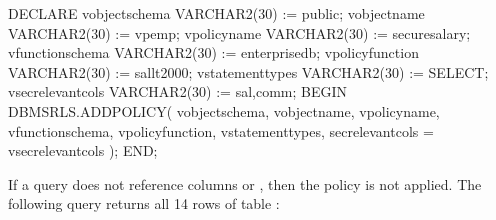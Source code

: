 \documentclass[letterpaper,10pt,english,openany,oneside]{sphinxmanual}
\begin{document}
%
\begin{sphinxVerbatim}[commandchars=\\\{\}]
DECLARE
    v\PYGZus{}object\PYGZus{}schema         VARCHAR2(30) := \PYGZsq{}public\PYGZsq{};
    v\PYGZus{}object\PYGZus{}name           VARCHAR2(30) := \PYGZsq{}vpemp\PYGZsq{};
    v\PYGZus{}policy\PYGZus{}name           VARCHAR2(30) := \PYGZsq{}secure\PYGZus{}salary\PYGZsq{};
    v\PYGZus{}function\PYGZus{}schema       VARCHAR2(30) := \PYGZsq{}enterprisedb\PYGZsq{};
    v\PYGZus{}policy\PYGZus{}function       VARCHAR2(30) := \PYGZsq{}sal\PYGZus{}lt\PYGZus{}2000\PYGZsq{};
    v\PYGZus{}statement\PYGZus{}types       VARCHAR2(30) := \PYGZsq{}SELECT\PYGZsq{};
    v\PYGZus{}sec\PYGZus{}relevant\PYGZus{}cols     VARCHAR2(30) := \PYGZsq{}sal,comm\PYGZsq{};
BEGIN
    DBMS\PYGZus{}RLS.ADD\PYGZus{}POLICY(
        v\PYGZus{}object\PYGZus{}schema,
        v\PYGZus{}object\PYGZus{}name,
        v\PYGZus{}policy\PYGZus{}name,
        v\PYGZus{}function\PYGZus{}schema,
        v\PYGZus{}policy\PYGZus{}function,
        v\PYGZus{}statement\PYGZus{}types,
        sec\PYGZus{}relevant\PYGZus{}cols =\PYGZgt{} v\PYGZus{}sec\PYGZus{}relevant\PYGZus{}cols
    );
END;
\end{sphinxVerbatim}

If a query does not reference columns  or , then the policy is
not applied. The following query returns all 14 rows of table :
\end{document}
